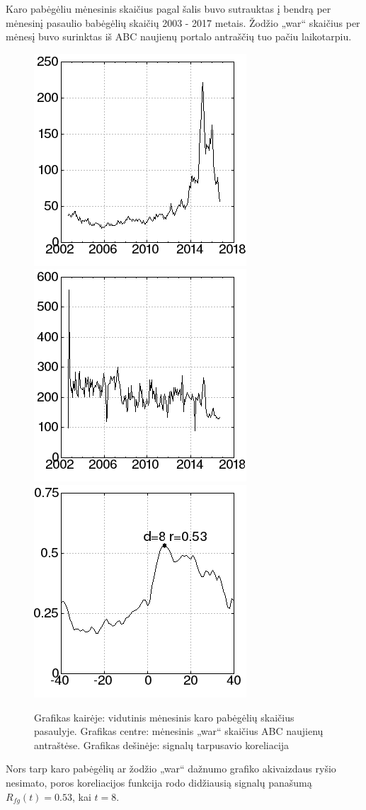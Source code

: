 Karo pabėgėliu mėnesinis skaičius pagal šalis\cite{refugees} buvo sutrauktas į bendrą per mėnesinį pasaulio babėgėlių skaičių 2003 - 2017 metais.
Žodžio „war“ skaičius per mėnesį buvo surinktas iš ABC naujienų portalo antraščių\cite{abcNews} tuo pačiu laikotarpiu.

\begin{figure}
\includegraphics[scale=0.65]{../scripts/refugees_war/refugees.png}
\includegraphics[scale=0.65]{../scripts/refugees_war/war.png}
\includegraphics[scale=0.65]{../scripts/refugees_war/result.png}
    \caption{Grafikas kairėje: vidutinis mėnesinis karo pabėgėlių skaičius pasaulyje. Grafikas centre: mėnesinis „war“ skaičius ABC naujienų antraštėse. Grafikas dešinėje: signalų tarpusavio koreliacija}
\end{figure}

Nors tarp karo pabėgėlių ar žodžio „war“ dažnumo grafiko akivaizdaus ryšio nesimato,
poros koreliacijos funkcija rodo didžiausią signalų panašumą \( R_{fg}(t) = 0.53 \), kai \( t = 8 \).
